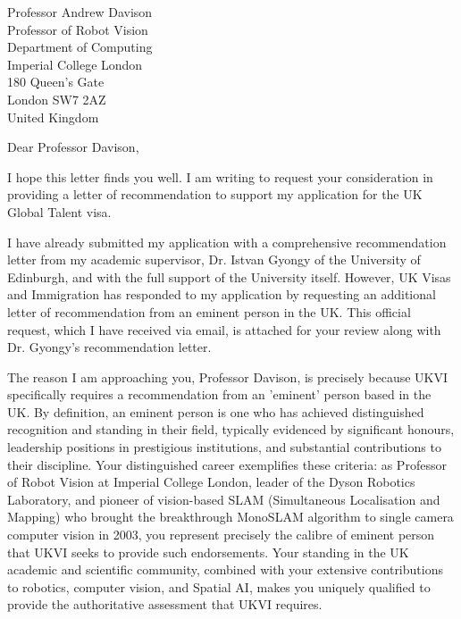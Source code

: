 \documentclass[12pt,a4paper]{letter}
\begin{document}
\begin{letter}{Professor Andrew Davison\\Professor of Robot Vision\\Department of Computing\\Imperial College London\\180 Queen's Gate\\London SW7 2AZ\\United Kingdom}

\date{\today}

\opening{Dear Professor Davison,}

I hope this letter finds you well. I am writing to request your consideration in providing a letter of recommendation to support my application for the UK Global Talent visa.

I have already submitted my application with a comprehensive recommendation letter from my academic supervisor, Dr. Istvan Gyongy of the University of Edinburgh, and with the full support of the University itself. However, UK Visas and Immigration has responded to my application by requesting an additional letter of recommendation from an eminent person in the UK. This official request, which I have received via email, is attached for your review along with Dr. Gyongy's recommendation letter.

The reason I am approaching you, Professor Davison, is precisely because UKVI specifically requires a recommendation from an 'eminent' person based in the UK. By definition, an eminent person is one who has achieved distinguished recognition and standing in their field, typically evidenced by significant honours, leadership positions in prestigious institutions, and substantial contributions to their discipline. Your distinguished career exemplifies these criteria: as Professor of Robot Vision at Imperial College London, leader of the Dyson Robotics Laboratory, and pioneer of vision-based SLAM (Simultaneous Localisation and Mapping) who brought the breakthrough MonoSLAM algorithm to single camera computer vision in 2003, you represent precisely the calibre of eminent person that UKVI seeks to provide such endorsements. Your standing in the UK academic and scientific community, combined with your extensive contributions to robotics, computer vision, and Spatial AI, makes you uniquely qualified to provide the authoritative assessment that UKVI requires.


\end{letter}
\end{document}
